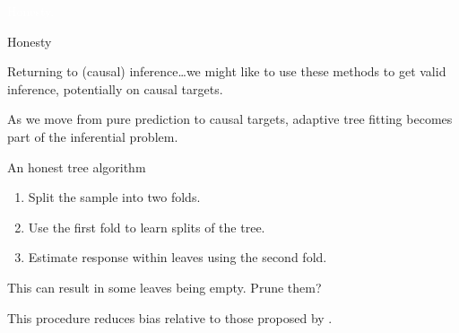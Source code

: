 \documentclass[xcolor={table}, handout]{beamer}
\begin{document}
\begin{transitionframe}
\centering

\LARGE \textcolor{white}{Honesty.}

\end{transitionframe}
\begin{frame}{Honesty}

\begin{wideitemize}
\item Returning to (causal) inference\dots \pause we might like to use these methods to get valid inference, potentially on causal targets.\pause
\item As we move from pure prediction to causal targets, adaptive tree fitting becomes part of the inferential problem.
\end{wideitemize}

\end{frame}



\begin{frame}{An honest tree algorithm}

\begin{enumerate}
\item Split the sample into two folds. \pause
\item Use the first fold to learn splits of the tree. \pause
\item Estimate response within leaves using the second fold. \pause
\end{enumerate}

\begin{wideitemize}
\item This can result in some leaves being empty. \pause Prune them? \pause
\item This procedure reduces bias relative to those proposed by \cite{breiman2001random}.
\end{wideitemize}

\end{frame}
\end{document}
